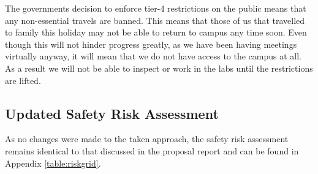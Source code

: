     The governments decision to enforce tier-4 restrictions on the public means that any non-essential travels are banned. This means that those of us that travelled to family this holiday may not be able to return to campus any time soon. Even though this will not hinder progress greatly, as we have been having meetings virtually anyway, it will mean that we do not have access to the campus at all. As a result we will not be able to inspect or work in the labs until the restrictions are lifted.

\subsection{Updated Safety Risk Assessment}

    As no changes were made to the taken approach, the safety risk assessment remains identical to that discussed in the proposal report \autocite{proposal_report} and can be found in Appendix \ref{table:riskgrid}. 